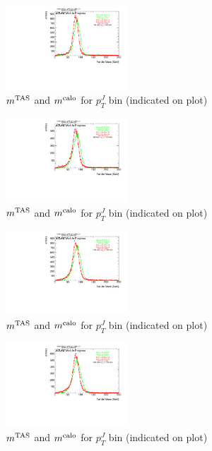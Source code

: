 \begin{figure}
 
\includegraphics[width=0.4\textwidth]{appendixB/mTAS_W_calibmCal_20:07:01-03-11-2016/12cfrt_h_FatJet_ptJ04m.pdf}
\caption{$m^\textrm{TAS}$ and $m^\textrm{calo}$ for $p_{T}^{J}$ bin (indicated on plot) }
 
\end{figure}
 
\begin{figure}
 
\includegraphics[width=0.4\textwidth]{appendixB/mTAS_W_calibmCal_20:07:01-03-11-2016/12cfrt_h_FatJet_ptJ05m.pdf}
\caption{$m^\textrm{TAS}$ and $m^\textrm{calo}$ for $p_{T}^{J}$ bin (indicated on plot) }
 
\end{figure}
 
\begin{figure}
 
\includegraphics[width=0.4\textwidth]{appendixB/mTAS_W_calibmCal_20:07:01-03-11-2016/12cfrt_h_FatJet_ptJ06m.pdf}
\caption{$m^\textrm{TAS}$ and $m^\textrm{calo}$ for $p_{T}^{J}$ bin (indicated on plot) }
 
\end{figure}
\begin{figure}
 
\includegraphics[width=0.4\textwidth]{appendixB/mTAS_W_calibmCal_20:07:01-03-11-2016/12cfrt_h_FatJet_ptJ07m.pdf}
\caption{$m^\textrm{TAS}$ and $m^\textrm{calo}$ for $p_{T}^{J}$ bin (indicated on plot) }
 
\end{figure}
 
